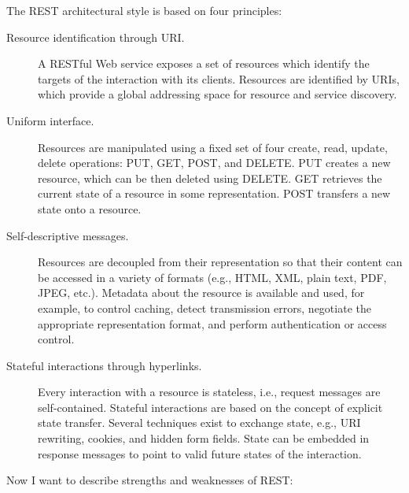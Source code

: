 \documentclass[thesis=B,english]{FITthesis}[2012/10/20]
\begin{document}
The REST architectural style is based on four principles:
	\begin{description}
		\item[Resource identification through URI.] A RESTful Web service exposes a set of resources which identify the targets of the interaction with its clients. Resources are identified by URIs, which provide a global addressing space for resource and service discovery. 			\item[Uniform interface.] Resources are manipulated using a fixed set of four create, read, update, delete operations: PUT, GET, POST, and DELETE. PUT creates a new resource, which can be then deleted using DELETE. GET retrieves the current state of a resource in some representation. POST transfers a new state onto a resource.\cite{soaprest}
		\item[Self-descriptive messages.] Resources are decoupled from their representation so that their content can be accessed in a variety of formats (e.g., HTML, XML, plain text, PDF, JPEG, etc.). Metadata about the resource is available and used, for example, to control caching, detect transmission errors, negotiate the appropriate representation format, and perform authentication or access control. 
		\item[Stateful interactions through hyperlinks.] Every interaction with a resource is stateless, i.e., request messages are self-contained. Stateful interactions are based on the concept of explicit state transfer. Several techniques exist to exchange state, e.g., URI rewriting, cookies, and hidden form fields. State can be embedded in response messages to point to valid future states of the interaction.\cite{soaprest}
	\end{description}
Now I want to describe strengths and weaknesses of REST:
\end{document}

